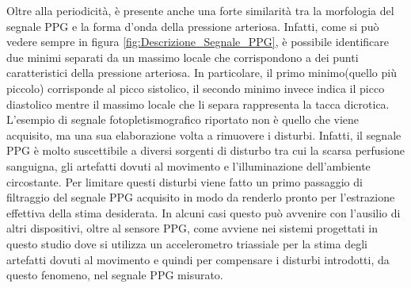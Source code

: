 Oltre alla periodicità, è presente anche una forte similarità tra la morfologia del segnale PPG e la forma d'onda della pressione arteriosa. Infatti, come si può vedere sempre in figura \ref{fig:Descrizione_Segnale_PPG}, è possibile identificare due minimi separati da un massimo locale che corrispondono a dei punti caratteristici della pressione arteriosa. In particolare, il primo minimo(quello più piccolo) corrisponde al picco sistolico, il secondo minimo invece indica il picco diastolico mentre il massimo locale che li separa rappresenta la tacca dicrotica. 
L'esempio di segnale fotopletismografico riportato non è quello che viene acquisito, ma una sua elaborazione volta a rimuovere i disturbi. Infatti, il segnale PPG è molto suscettibile a diversi sorgenti di disturbo tra cui la scarsa perfusione sanguigna, gli artefatti dovuti al movimento e l'illuminazione dell'ambiente circostante. Per limitare questi disturbi viene fatto un primo passaggio di filtraggio del segnale PPG acquisito in modo da renderlo pronto per l'estrazione effettiva della stima desiderata. In alcuni casi questo può avvenire con l'ausilio di altri dispositivi, oltre al sensore PPG, come avviene nei sistemi progettati in questo studio dove si utilizza un accelerometro triassiale per la stima degli artefatti dovuti al movimento e quindi per compensare i disturbi introdotti, da questo fenomeno, nel segnale PPG misurato.
